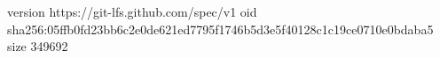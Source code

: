 version https://git-lfs.github.com/spec/v1
oid sha256:05ffb0fd23bb6c2e0de621ed7795f1746b5d3e5f40128c1c19ce0710e0bdaba5
size 349692
